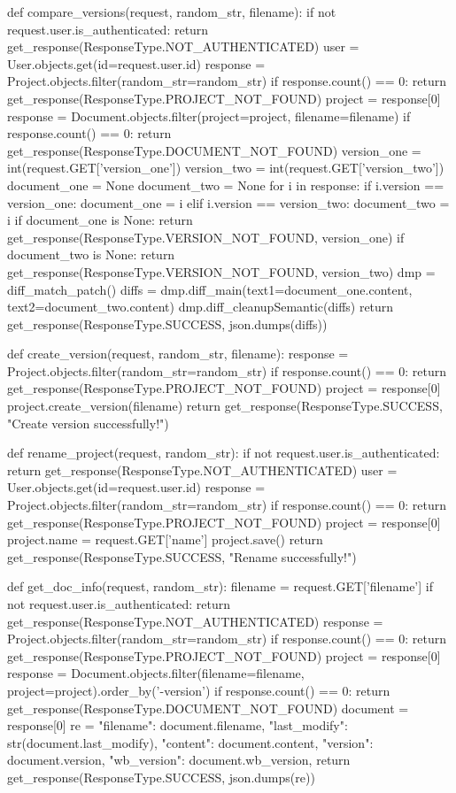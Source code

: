 def compare_versions(request, random_str, filename):
    if not request.user.is_authenticated:
        return get_response(ResponseType.NOT_AUTHENTICATED)
    user = User.objects.get(id=request.user.id)
    response = Project.objects.filter(random_str=random_str)
    if response.count() == 0:
        return get_response(ResponseType.PROJECT_NOT_FOUND)
    project = response[0]
    response = Document.objects.filter(project=project, filename=filename)
    if response.count() == 0:
        return get_response(ResponseType.DOCUMENT_NOT_FOUND)
    version_one = int(request.GET['version_one'])
    version_two = int(request.GET['version_two'])
    document_one = None
    document_two = None
    for i in response:
        if i.version == version_one:
            document_one = i
        elif i.version == version_two:
            document_two = i
    if document_one is None:
        return get_response(ResponseType.VERSION_NOT_FOUND, version_one)
    if document_two is None:
        return get_response(ResponseType.VERSION_NOT_FOUND, version_two)
    dmp = diff_match_patch()
    diffs = dmp.diff_main(text1=document_one.content, text2=document_two.content)
    dmp.diff_cleanupSemantic(diffs)
    return get_response(ResponseType.SUCCESS, json.dumps(diffs))


def create_version(request, random_str, filename):
    response = Project.objects.filter(random_str=random_str)
    if response.count() == 0:
        return get_response(ResponseType.PROJECT_NOT_FOUND)
    project = response[0]
    project.create_version(filename)
    return get_response(ResponseType.SUCCESS, "Create version successfully!")


def rename_project(request, random_str):
    if not request.user.is_authenticated:
        return get_response(ResponseType.NOT_AUTHENTICATED)
    user = User.objects.get(id=request.user.id)
    response = Project.objects.filter(random_str=random_str)
    if response.count() == 0:
        return get_response(ResponseType.PROJECT_NOT_FOUND)
    project = response[0]
    project.name = request.GET['name']
    project.save()
    return get_response(ResponseType.SUCCESS, "Rename successfully!")


def get_doc_info(request, random_str):
    filename = request.GET['filename']
    if not request.user.is_authenticated:
        return get_response(ResponseType.NOT_AUTHENTICATED)
    response = Project.objects.filter(random_str=random_str)
    if response.count() == 0:
        return get_response(ResponseType.PROJECT_NOT_FOUND)
    project = response[0]
    response = Document.objects.filter(filename=filename, project=project).order_by('-version')
    if response.count() == 0:
        return get_response(ResponseType.DOCUMENT_NOT_FOUND)
    document = response[0]
    re = {
        "filename": document.filename,
        "last_modify": str(document.last_modify),
        "content": document.content,
        "version": document.version,
        "wb_version": document.wb_version,
    }
    return get_response(ResponseType.SUCCESS, json.dumps(re))


